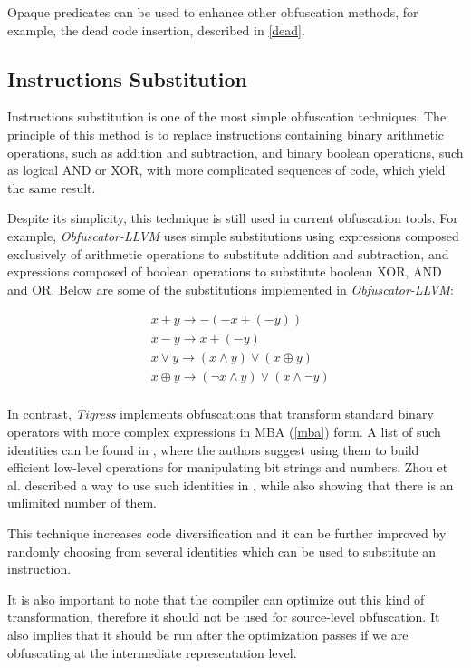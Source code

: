 \documentclass[
  digital, %
  table,   %
  twoside, %
  nolof,     %
  nolot,     %
]{fithesis3}
\theoremstyle{definition}
\begin{document}
Opaque predicates can be used to enhance other obfuscation methods, for example, the dead code insertion, described in \ref{dead}. 

\subsection{Instructions Substitution} \label{substitution}
Instructions substitution is one of the most simple obfuscation techniques. The principle of this method is to replace instructions containing binary arithmetic operations, such as addition and subtraction, and binary boolean operations, such as logical AND or XOR, with more complicated sequences of code, which yield the same result. 

Despite its simplicity, this technique is still used in current obfuscation tools. For example, \textit{Obfuscator-LLVM} uses simple substitutions using expressions composed exclusively of arithmetic operations to substitute addition and subtraction, and expressions composed of boolean operations to substitute boolean XOR, AND and OR. Below are some of the substitutions implemented in \textit{Obfuscator-LLVM}:

$$
    \begin{aligned}
    &x + y \rightarrow -(-x + (-y))\\
    &x - y \rightarrow x + (-y)\\
    &x \vee y \rightarrow (x \wedge y) \vee (x \oplus y)\\
    &x \oplus y \rightarrow (\neg x \wedge y ) \vee (x \wedge \neg y)\\ 
    \end{aligned}
$$

In contrast, \textit{Tigress} implements obfuscations that transform standard binary operators with more complex expressions in MBA (\ref{mba}) form. A list of such identities can be found in \cite{hackers_delight}, where the authors suggest using them to build efficient low-level operations for manipulating bit strings and numbers. Zhou et al. described a way to use such identities in \cite{mba_zhou}, while also showing that there is an unlimited number of them. 

This technique increases code diversification and it can be further improved by randomly choosing from several identities which can be used to substitute an instruction. 

It is also important to note that the compiler can optimize out this kind of transformation, therefore it should not be used for source-level obfuscation. It also implies that it should be run after the optimization passes if we are obfuscating at the intermediate representation level. 
\end{document}
